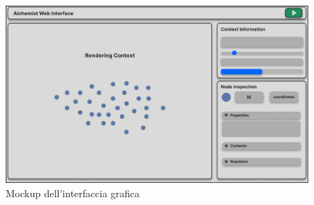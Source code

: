 \begin{figure}[htb]
	\centering
	\includegraphics[scale=0.65]{imgs/Interface_Layout.pdf}
	\caption{Mockup dell'interfaccia grafica}
	\label{fig:interface-layout}
\end{figure}

